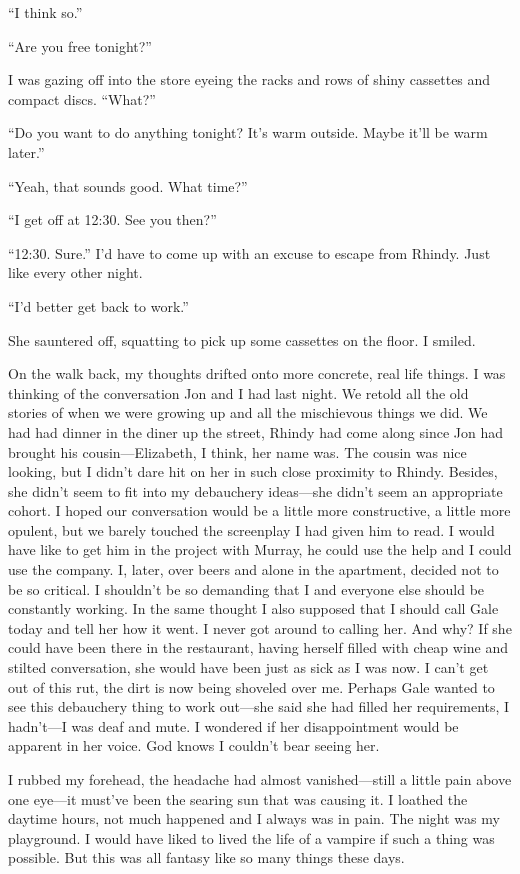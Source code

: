 ``I think so.''

``Are you free tonight?''

I was gazing off into the store eyeing the racks and rows of shiny
cassettes and compact discs. ``What?''

``Do you want to do anything tonight? It's warm outside. Maybe it'll be
warm later.''

``Yeah, that sounds good. What time?''

``I get off at 12:30. See you then?''

``12:30. Sure.'' I'd have to come up with an excuse to escape from
Rhindy. Just like every other night.

``I'd better get back to work.''

She sauntered off, squatting to pick up some cassettes on the floor. I
smiled.

On the walk back, my thoughts drifted onto more concrete, real life
things. I was thinking of the conversation Jon and I had last night. We
retold all the old stories of when we were growing up and all the
mischievous things we did. We had had dinner in the diner up the street,
Rhindy had come along since Jon had brought his cousin---Elizabeth, I
think, her name was. The cousin was nice looking, but I didn't dare hit
on her in such close proximity to Rhindy. Besides, she didn't seem to
fit into my debauchery ideas---she didn't seem an appropriate cohort. I
hoped our conversation would be a little more constructive, a little
more opulent, but we barely touched the screenplay I had given him to
read. I would have like to get him in the project with Murray, he could
use the help and I could use the company. I, later, over beers and alone
in the apartment, decided not to be so critical. I shouldn't be so
demanding that I and everyone else should be constantly working. In the
same thought I also supposed that I should call Gale today and tell her
how it went. I never got around to calling her. And why? If she could
have been there in the restaurant, having herself filled with cheap wine
and stilted conversation, she would have been just as sick as I was now.
I can't get out of this rut, the dirt is now being shoveled over me.
Perhaps Gale wanted to see this debauchery thing to work out---she said
she had filled her requirements, I hadn't---I was deaf and mute. I
wondered if her disappointment would be apparent in her voice. God knows
I couldn't bear seeing her.

I rubbed my forehead, the headache had almost vanished---still a little
pain above one eye---it must've been the searing sun that was causing
it. I loathed the daytime hours, not much happened and I always was in
pain. The night was my playground. I would have liked to lived the life
of a vampire if such a thing was possible. But this was all fantasy like
so many things these days.


